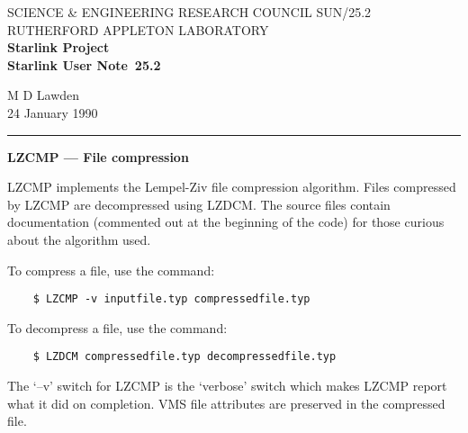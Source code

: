 \pagestyle{myheadings}

\newcommand{\stardoccategory}  {Starlink User Note}
\newcommand{\stardocinitials}  {SUN}
\newcommand{\stardocnumber}    {25.2}
\newcommand{\stardocauthors}   {M D Lawden}
\newcommand{\stardocdate}      {24 January 1990}
\newcommand{\stardoctitle}     {LZCMP --- File compression}

\newcommand{\stardocname}{\stardocinitials /\stardocnumber}
\markright{\stardocname}
\setlength{\textwidth}{160mm}
\setlength{\textheight}{240mm}
\setlength{\topmargin}{-5mm}
\setlength{\oddsidemargin}{0mm}
\setlength{\evensidemargin}{0mm}
\setlength{\parindent}{0mm}
\setlength{\parskip}{\medskipamount}
\setlength{\unitlength}{1mm}


\thispagestyle{empty}
SCIENCE \& ENGINEERING RESEARCH COUNCIL \hfill \stardocname\\
RUTHERFORD APPLETON LABORATORY\\
{\large\bf Starlink Project\\}
{\large\bf \stardoccategory\ \stardocnumber}
\begin{flushright}
\stardocauthors\\
\stardocdate
\end{flushright}
\vspace{-4mm}
\rule{\textwidth}{0.5mm}
\vspace{5mm}
\begin{center}
{\Large\bf \stardoctitle}
\end{center}
\vspace{5mm}

LZCMP implements the Lempel-Ziv file compression algorithm. 
Files compressed by LZCMP are decompressed using LZDCM.
The source files contain documentation (commented out at the beginning of the
code) for those curious about the algorithm used.

To compress a file, use the command:
\begin{verbatim}
    $ LZCMP -v inputfile.typ compressedfile.typ
\end{verbatim}
To decompress a file, use the command:
\begin{verbatim}
    $ LZDCM compressedfile.typ decompressedfile.typ
\end{verbatim}
The `--v' switch for LZCMP is the `verbose' switch which makes LZCMP report what
it did on completion.
VMS file attributes are preserved in the compressed file. 

